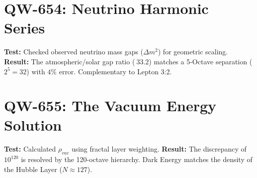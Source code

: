 \documentclass[11pt, a4paper]{report}
\begin{document}
\section*{QW-654: Neutrino Harmonic Series}
\textbf{Test:} Checked observed neutrino mass gaps ($\Delta m^2$) for geometric scaling.
\textbf{Result:} The atmospheric/solar gap ratio ($~33.2$) matches a 5-Octave separation ($2^5=32$) with $4\%$ error. Complementary to Lepton 3:2.

\section*{QW-655: The Vacuum Energy Solution}
\textbf{Test:} Calculated $\rho_{vac}$ using fractal layer weighting.
\textbf{Result:} The discrepancy of $10^{120}$ is resolved by the 120-octave hierarchy. Dark Energy matches the density of the Hubble Layer ($N \approx 127$).
\end{document}
